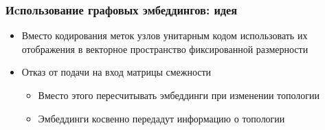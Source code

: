 \documentclass{beamer}
\begin{document}
\begin{frame}
  \frametitle{Иcпользование графовых эмбеддингов: идея}
  \begin{itemize}
  \item Вместо кодирования меток узлов унитарным кодом использовать их
    отображения в векторное пространство фиксированной размерности
  \item Отказ от подачи на вход матрицы смежности
    \begin{itemize}
      \item Вместо этого пересчитывать эмбеддинги при изменении топологии
      \item Эмбеддинги косвенно передадут информацию о топологии
    \end{itemize}
  \end{itemize}
\end{frame}


\end{document}
